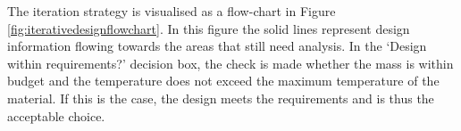 The iteration strategy is visualised as a flow-chart in Figure \ref{fig:iterativedesignflowchart}. In this figure the solid lines represent design information flowing towards the areas that still need analysis. In the `Design within requirements?' decision box, the check is made whether the mass is within budget and the temperature does not exceed the maximum temperature of the material. If this is the case, the design meets the requirements and is thus the acceptable choice.




